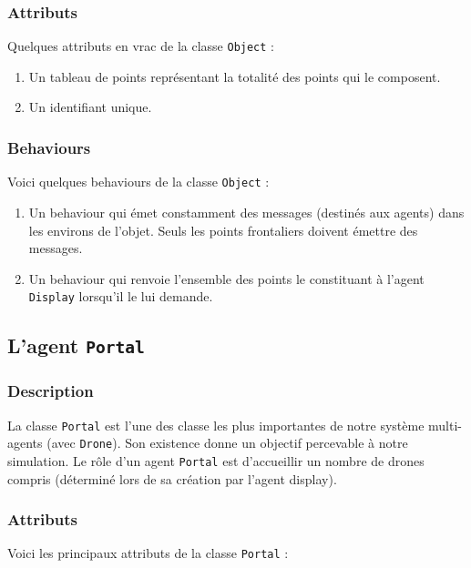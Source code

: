\documentclass[11pt]{report}
\begin{document}
\subsubsection{Attributs}

Quelques attributs en vrac de la classe \verb|Object| :

\begin{enumerate}
\item Un tableau de points représentant la totalité des points qui le composent.

\item Un identifiant unique.
\end{enumerate}

\subsubsection{Behaviours}

Voici quelques behaviours de la classe \verb|Object| :

\begin{enumerate}
\item Un behaviour qui émet constamment des messages (destinés aux agents) dans les environs de l'objet. Seuls les points frontaliers doivent émettre des messages.

\item Un behaviour qui renvoie l'ensemble des points le constituant à l'agent \verb|Display| lorsqu'il le lui demande.
\end{enumerate}

\subsection{L'agent \protect\Verb+Portal+}

\subsubsection{Description}

La classe \verb|Portal| est l'une des classe les plus importantes de notre système multi-agents (avec \verb|Drone|). Son existence donne un objectif percevable à notre simulation. Le rôle d'un agent \verb|Portal| est d’accueillir un nombre de drones compris (déterminé lors de sa création par l'agent display).

\subsubsection{Attributs}
Voici les principaux attributs de la classe \verb|Portal| :
\end{document}
